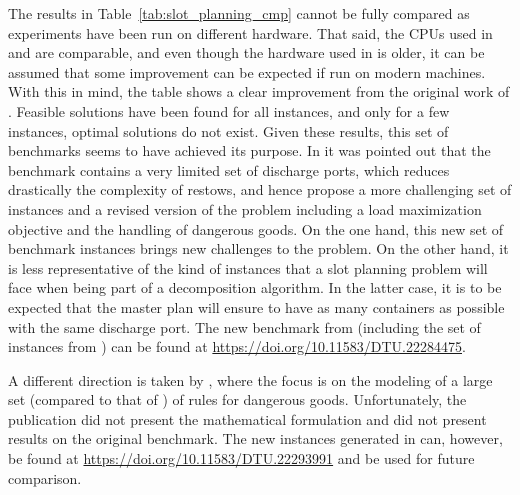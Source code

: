 \documentclass[preprint,12pt,authoryear]{elsarticle}
\begin{document}
The results in Table~\ref{tab:slot_planning_cmp} cannot be fully compared as experiments have been run on different hardware. That said, the CPUs used in \cite{Korach2020MatheuristicsBays} and \cite{Rashed2021AVessels} are comparable, and even though the hardware used in \cite{Parreno2016AProblem} is older, it can be assumed that some improvement can be expected if run on modern machines. With this in mind, the table shows a clear improvement from the original work of \cite{Delgado2009,Pacino2013FastSearch}. Feasible solutions have been found for all instances, and only for a few instances, optimal solutions do not exist. Given these results, this set of benchmarks seems to have achieved its purpose. In \cite{Parreno2016AProblem} it was pointed out that the benchmark contains a very limited set of discharge ports, which reduces drastically the complexity of restows, and hence propose a more challenging set of instances and a revised version of the problem including a load maximization objective and the handling of dangerous goods. On the one hand, this new set of benchmark instances brings new challenges to the problem. On the other hand, it is less representative of the kind of instances that a slot planning problem will face when being part of a decomposition algorithm. In the latter case, it is to be expected that the master plan will ensure to have as many containers as possible with the same discharge port. The new benchmark from \cite{Parreno2016AProblem} (including the set of instances from \cite{Delgado2009}) can be found at \url{https://doi.org/10.11583/DTU.22284475}.

A different direction is taken by \cite{Kebedow2019IncludingStowage}, where the focus is on the modeling of a large set (compared to that of \cite{Parreno2016AProblem}) of rules for dangerous goods. Unfortunately, the publication did not present the mathematical formulation and did not present results on the original benchmark. The new instances generated in \cite{Kebedow2019IncludingProblem} can, however, be found at \url{https://doi.org/10.11583/DTU.22293991} and be used for future comparison.
\end{document}
